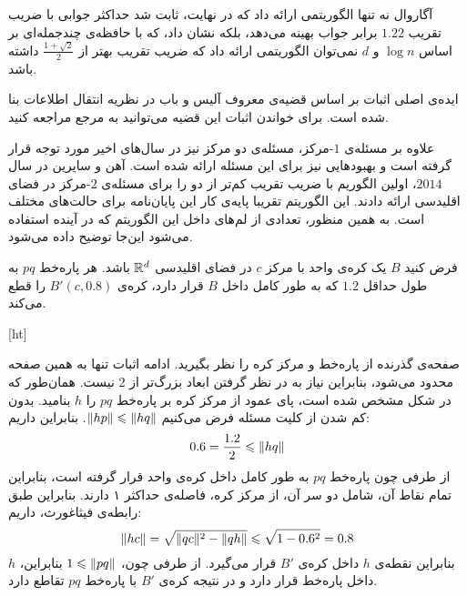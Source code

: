 آگاروال نه تنها الگوریتمی ارائه داد که در نهایت، ثابت شد حداکثر جوابی با ضریب تقریب $1.22$ برابر جواب بهینه می‌دهد، بلکه نشان داد، که با حافظه‌ی چندجمله‌ای بر اساس $\log{n}$ و $d$ نمی‌توان الگوریتمی ارائه داد که ضریب تقریب بهتر از $\frac{1 + \sqrt{2}}{2}$ داشته باشد.




ایده‌ی اصلی اثبات بر اساس قضیه‌ی معروف آلیس و باب در نظریه انتقال اطلاعات بنا شده است. برای خواندن اثبات این قضیه می‌توانید به مرجع  مراجعه کنید.


علاوه بر مسئله‌ی $1$-مرکز، مسئله‌ی دو مرکز نیز در سال‌های اخیر مورد توجه قرار گرفته است و بهبود‌هایی نیز برای این مسئله ارائه شده است. آهن و سایرین  در سال $2014$، اولین الگوریم با ضریب تقریب کم‌تر از دو را برای مسئله‌ی $2$-مرکز در فضای اقلیدسی ارائه دادند. این الگوریتم تقریبا پایه‌ی کار این پایان‌نامه برای حالت‌های مختلف است. به همین منظور، تعدادی از لم‌های داخل این الگوریتم که در آینده استفاده می‌شود این‌جا توضیح داده می‌شود.


فرض کنید $B$ یک کره‌ی واحد با مرکز $c$ در فضای اقلیدسی $\mathbb{R}^d$ باشد. هر پاره‌خط $pq$ به طول حداقل $1.2$ که به طور کامل داخل $B$ قرار دارد، کره‌ی $B'(c, 0.8)$ را قطع می‌کند.

[ht]


صفحه‌ی گذرنده از پاره‌خط و مرکز کره را نظر بگیرید. ادامه اثبات تنها به همین صفحه محدود می‌شود، بنابراین نیاز به در نظر گرفتن ابعاد بزرگ‌تر از $2$ نیست. همان‌طور که در شکل  مشخص شده است، پای عمود از مرکز کره بر پاره‌خط $pq$ را $h$ بنامید. بدون کم شدن از کلیت مسئله فرض می‌کنیم $\|{hp}\| \leqslant \|{hq}\|$. بنابراین داریم:
$$0.6 = \frac{1.2}{2} \leqslant \|{hq}\|$$
از‌ طرفی چون پاره‌خط $pq$ به طور کامل داخل کره‌ی واحد قرار گرفته است، بنابراین تمام نقاط آن، شامل دو سر آن، از مرکز کره، فاصله‌ی حداکثر ۱ دارند. بنابراین طبق رابطه‌ی فیثاغورث، داریم:
$$\|{hc}\| = \sqrt{\|{qc}\|^2 - \|{qh}\|} \leqslant \sqrt{1 - 0.6^2} = 0.8$$
بنابراین نقطه‌ی $h$ داخل کره‌ی $B'$ قرار می‌گیرد. از طرفی چون، $1 \leqslant \|{pq}\|$ بنابراین، $h$ داخل پاره‌خط قرار دارد و در نتیجه کره‌ی $B'$ با پاره‌خط $pq$ تقاطع دارد. 

